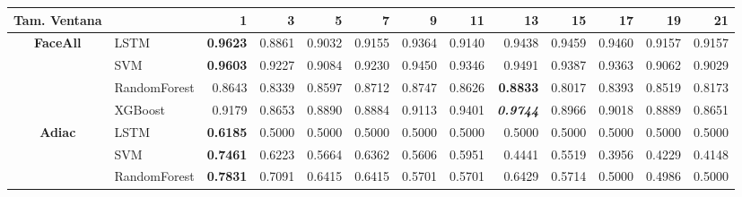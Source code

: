 \begin{table}[H]
	\centering
	\begin{adjustbox}{max width=12cm}
		\begin{tabular}{|c|l|r|r|r|r|r|r|r|r|r|r|r|}
			\hline
			\textbf{Tam. Ventana} &              & 1                        & 3                        & 5               & 7                        & 9               & 11     & 13              & 15                       & 17                       & 19              & 21              \\
			\hline
			\textbf{FaceAll}      & LSTM         & \textbf{0.9623} & 0.8861                   & 0.9032          & 0.9155                   & 0.9364          & 0.9140 & 0.9438          & 0.9459                   & 0.9460                   & 0.9157          & 0.9157          \\
			                      & SVM          & \textbf{0.9603}          & 0.9227                   & 0.9084          & 0.9230                   & 0.9450          & 0.9346 & 0.9491          & 0.9387                   & 0.9363                   & 0.9062          & 0.9029          \\
			                      & RandomForest & 0.8643                   & 0.8339                   & 0.8597          & 0.8712                   & 0.8747          & 0.8626 & \textbf{0.8833} & 0.8017                   & 0.8393                   & 0.8519          & 0.8173          \\
			                      & XGBoost      & 0.9179                   & 0.8653                   & 0.8890          & 0.8884                   & 0.9113          & 0.9401 & \textit{\textbf{0.9744}} & 0.8966                   & 0.9018                   & 0.8889          & 0.8651          \\
			\hline
			\textbf{Adiac}        & LSTM         & \textbf{0.6185}          & 0.5000                   & 0.5000          & 0.5000                   & 0.5000          & 0.5000 & 0.5000          & 0.5000                   & 0.5000                   & 0.5000          & 0.5000          \\
			                      & SVM          & \textbf{0.7461}          & 0.6223                   & 0.5664          & 0.6362                   & 0.5606          & 0.5951 & 0.4441          & 0.5519                   & 0.3956                   & 0.4229          & 0.4148          \\
			                      & RandomForest & \textbf{0.7831}          & 0.7091                   & 0.6415          & 0.6415                   & 0.5701          & 0.5701 & 0.6429          & 0.5714                   & 0.5000                   & 0.4986          & 0.5000          \\

\end{tabular}
\end{adjustbox}
\end{table}

